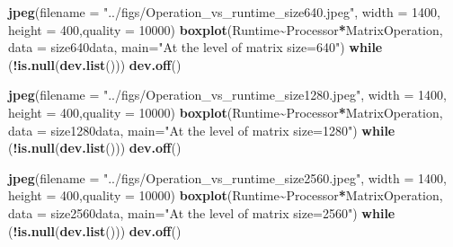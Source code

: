 \documentclass[
]{article}
\newenvironment{Shaded}{\begin{snugshade}}{\end{snugshade}}
\newcommand{\ControlFlowTok}[1]{\textcolor[rgb]{0.13,0.29,0.53}{\textbf{#1}}}
\newcommand{\DataTypeTok}[1]{\textcolor[rgb]{0.13,0.29,0.53}{#1}}
\newcommand{\DecValTok}[1]{\textcolor[rgb]{0.00,0.00,0.81}{#1}}
\newcommand{\KeywordTok}[1]{\textcolor[rgb]{0.13,0.29,0.53}{\textbf{#1}}}
\newcommand{\NormalTok}[1]{#1}
\newcommand{\OperatorTok}[1]{\textcolor[rgb]{0.81,0.36,0.00}{\textbf{#1}}}
\newcommand{\StringTok}[1]{\textcolor[rgb]{0.31,0.60,0.02}{#1}}
\begin{document}
\begin{Shaded}
\begin{Highlighting}[]
\KeywordTok{jpeg}\NormalTok{(}\DataTypeTok{filename =} \StringTok{"../figs/Operation\_vs\_runtime\_size640.jpeg"}\NormalTok{, }\DataTypeTok{width =} \DecValTok{1400}\NormalTok{, }\DataTypeTok{height =} \DecValTok{400}\NormalTok{,}\DataTypeTok{quality =} \DecValTok{10000}\NormalTok{)}
\KeywordTok{boxplot}\NormalTok{(Runtime}\OperatorTok{\textasciitilde{}}\NormalTok{Processor}\OperatorTok{*}\NormalTok{MatrixOperation, }\DataTypeTok{data =}\NormalTok{ size640data, }\DataTypeTok{main=}\StringTok{"At the level of matrix size=640"}\NormalTok{)}
\ControlFlowTok{while}\NormalTok{ (}\OperatorTok{!}\KeywordTok{is.null}\NormalTok{(}\KeywordTok{dev.list}\NormalTok{()))  }\KeywordTok{dev.off}\NormalTok{()}
\end{Highlighting}
\end{Shaded}

\begin{Shaded}
\begin{Highlighting}[]
\KeywordTok{jpeg}\NormalTok{(}\DataTypeTok{filename =} \StringTok{"../figs/Operation\_vs\_runtime\_size1280.jpeg"}\NormalTok{, }\DataTypeTok{width =} \DecValTok{1400}\NormalTok{, }\DataTypeTok{height =} \DecValTok{400}\NormalTok{,}\DataTypeTok{quality =} \DecValTok{10000}\NormalTok{)}
\KeywordTok{boxplot}\NormalTok{(Runtime}\OperatorTok{\textasciitilde{}}\NormalTok{Processor}\OperatorTok{*}\NormalTok{MatrixOperation, }\DataTypeTok{data =}\NormalTok{ size1280data, }\DataTypeTok{main=}\StringTok{"At the level of matrix size=1280"}\NormalTok{)}
\ControlFlowTok{while}\NormalTok{ (}\OperatorTok{!}\KeywordTok{is.null}\NormalTok{(}\KeywordTok{dev.list}\NormalTok{()))  }\KeywordTok{dev.off}\NormalTok{()}
\end{Highlighting}
\end{Shaded}

\begin{Shaded}
\begin{Highlighting}[]
\KeywordTok{jpeg}\NormalTok{(}\DataTypeTok{filename =} \StringTok{"../figs/Operation\_vs\_runtime\_size2560.jpeg"}\NormalTok{, }\DataTypeTok{width =} \DecValTok{1400}\NormalTok{, }\DataTypeTok{height =} \DecValTok{400}\NormalTok{,}\DataTypeTok{quality =} \DecValTok{10000}\NormalTok{)}
\KeywordTok{boxplot}\NormalTok{(Runtime}\OperatorTok{\textasciitilde{}}\NormalTok{Processor}\OperatorTok{*}\NormalTok{MatrixOperation, }\DataTypeTok{data =}\NormalTok{ size2560data, }\DataTypeTok{main=}\StringTok{"At the level of matrix size=2560"}\NormalTok{)}
\ControlFlowTok{while}\NormalTok{ (}\OperatorTok{!}\KeywordTok{is.null}\NormalTok{(}\KeywordTok{dev.list}\NormalTok{()))  }\KeywordTok{dev.off}\NormalTok{()}
\end{Highlighting}
\end{Shaded}
\end{document}
